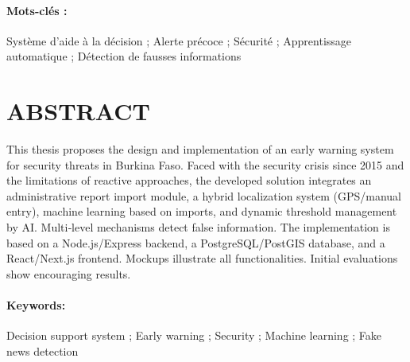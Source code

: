 \documentclass[12pt,a4paper]{article}
\begin{document}
\paragraph{Mots-clés :} Système d'aide à la décision ; Alerte précoce ; Sécurité ; Apprentissage automatique ; Détection de fausses informations

\newpage
{}
{}
\section*{ABSTRACT}
\vspace{1cm}
This thesis proposes the design and implementation of an early warning system for security threats in Burkina Faso. Faced with the security crisis since 2015 and the limitations of reactive approaches, the developed solution integrates an administrative report import module, a hybrid localization system (GPS/manual entry), machine learning based on imports, and dynamic threshold management by AI. Multi‑level mechanisms detect false information. The implementation is based on a Node.js/Express backend, a PostgreSQL/PostGIS database, and a React/Next.js frontend. Mockups illustrate all functionalities. Initial evaluations show encouraging results.

\paragraph{Keywords:} Decision support system ; Early warning ; Security ; Machine learning ; Fake news detection

\newpage
\renewcommand{\contentsname}{}
\tableofcontents

\newpage
{}
{}
\end{document}
